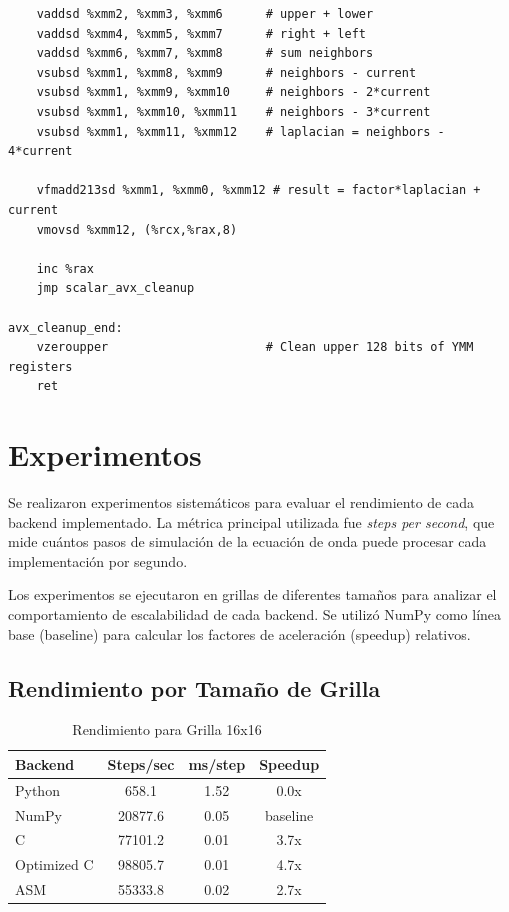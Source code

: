 \documentclass[a4paper]{article}
\begin{document}
\begin{verbatim}
    vaddsd %xmm2, %xmm3, %xmm6      # upper + lower
    vaddsd %xmm4, %xmm5, %xmm7      # right + left
    vaddsd %xmm6, %xmm7, %xmm8      # sum neighbors
    vsubsd %xmm1, %xmm8, %xmm9      # neighbors - current
    vsubsd %xmm1, %xmm9, %xmm10     # neighbors - 2*current
    vsubsd %xmm1, %xmm10, %xmm11    # neighbors - 3*current
    vsubsd %xmm1, %xmm11, %xmm12    # laplacian = neighbors - 4*current
    
    vfmadd213sd %xmm1, %xmm0, %xmm12 # result = factor*laplacian + current
    vmovsd %xmm12, (%rcx,%rax,8)
    
    inc %rax
    jmp scalar_avx_cleanup
    
avx_cleanup_end:
    vzeroupper                      # Clean upper 128 bits of YMM registers
    ret
\end{verbatim}

\section{Experimentos}

Se realizaron experimentos sistemáticos para evaluar el rendimiento de cada backend implementado. La métrica principal utilizada fue \textit{steps per second}, que mide cuántos pasos de simulación de la ecuación de onda puede procesar cada implementación por segundo.

Los experimentos se ejecutaron en grillas de diferentes tamaños para analizar el comportamiento de escalabilidad de cada backend. Se utilizó NumPy como línea base (baseline) para calcular los factores de aceleración (speedup) relativos.

\subsection{Rendimiento por Tamaño de Grilla}

\begin{table}[h]
    \centering
    \caption{Rendimiento para Grilla 16x16}
    \begin{tabular}{@{}lccc@{}}
        \toprule
        Backend     & Steps/sec & ms/step & Speedup  \\
        \midrule
        Python      & 658.1     & 1.52    & 0.0x     \\
        NumPy       & 20877.6   & 0.05    & baseline \\
        C           & 77101.2   & 0.01    & 3.7x     \\
        Optimized C & 98805.7   & 0.01    & 4.7x     \\
        ASM         & 55333.8   & 0.02    & 2.7x     \\
        \bottomrule
    \end{tabular}
    \label{tab:perf_16x16}
\end{table}
\end{document}
